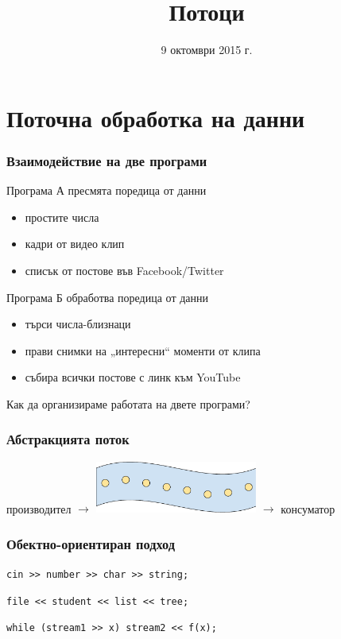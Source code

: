 \documentclass{beamer}
\title{Потоци}
\date{9 октомври 2015 г.}
\begin{document}
\begin{frame}
  \titlepage
\end{frame}

\section{Поточна обработка на данни}

\begin{frame}
  \frametitle{Взаимодействие на две програми}

  Програма А пресмята поредица от данни
  \begin{itemize}
  \item простите числа
  \item кадри от видео клип
  \item списък от постове във Facebook/Twitter
  \end{itemize}
  \vspace{1em}
  
  Програма Б обработва поредица от данни
  \begin{itemize}
  \item търси числа-близнаци
  \item прави снимки на „интересни“ моменти от
    клипа
  \item събира всички постове с линк към YouTube
  \end{itemize}
  \vspace{2em}
  
  \alert{Как да организираме работата на двете програми?}
\end{frame}

\begin{frame}
  \frametitle{Абстракцията поток}

  \begin{center}
    производител
    $\longrightarrow$ \includegraphics[width=0.4\textwidth,valign=c]{images/abstract_stream.pdf}
    $\longrightarrow$ консуматор
  \end{center}
\end{frame}

\begin{frame}
  \frametitle{Обектно-ориентиран подход}

  \tt{cin >{}> number >{}> char >{}> string;}
  \vspace{2em}

  \tt{file <{}< student <{}< list <{}< tree;}
  \vspace{2em}
  
  \tt{while (stream1 >{}> x) stream2 <{}< f(x);}
\end{frame}
\end{document}
